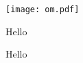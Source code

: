 \documentclass[a0]{a0poster}
\begin{document}
\raggedcolumns

\maketitle
\vspace{1cm}

\begin{multicols}{4}
    \begin{figure}[H]
        \texttt{[image: om.pdf]}
        \caption{Hello}\label{label}
    \end{figure}
    \begin{figure}[H]
        \centering
        
        \caption{Hello}\label{label2}
    \end{figure}

\end{multicols}
\end{document}
